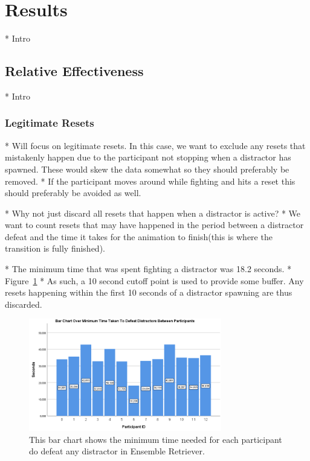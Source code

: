 \section{Results}
* Intro

\subsection{Relative Effectiveness}
* Intro
\subsubsection{Legitimate Resets}
* Will focus on legitimate resets. In this case, we want to exclude any resets that mistakenly happen due to the participant not stopping when a distractor has spawned. These would skew the data somewhat so they should preferably be removed. 
* If the participant moves around while fighting and hits a reset this should preferably be avoided as well. 

* Why not just discard all resets that happen when a distractor is active?
    * We want to count resets that may have happened in the period between a distractor defeat and the time it takes for the animation to finish(this is where the transition is fully finished). 
    
    * The minimum time that was spent fighting a distractor was 18.2 seconds.
    * Figure~\ref{fig:minDistractorDefeatTime}
    * As such, a 10 second cutoff point is used to provide some buffer. Any resets happening within the first 10 seconds of a distractor spawning are thus discarded.

\begin{figure}[tbph]
    \centering
    \includegraphics[width=0.75\textwidth]{figures/graphs/MinDistractorDefeatTime.png}
    \caption[Minimum Time Needed To Defeat Distractors Between Participants]{This bar chart shows the minimum time needed for each participant do defeat any distractor in Ensemble Retriever.}
    \label{fig:minDistractorDefeatTime}
\end{figure}

